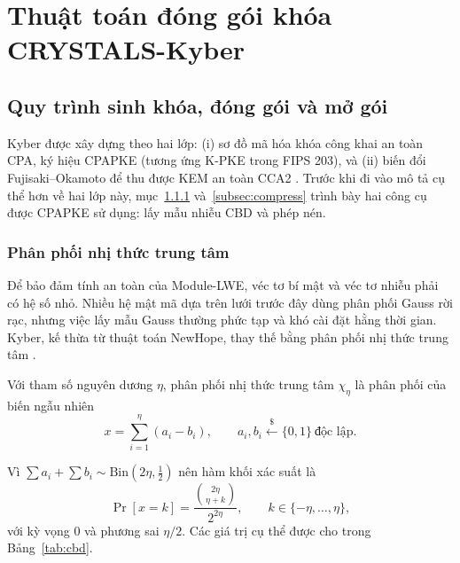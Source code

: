 \documentclass[../LuanVan.tex]{subfiles}
\begin{document}
\section{Thuật toán đóng gói khóa CRYSTALS-Kyber}\label{sec:kyber}
\subsection{Quy trình sinh khóa, đóng gói và mở gói}\label{subsec:quytrinh}

Kyber được xây dựng theo hai lớp: (i) sơ đồ mã hóa khóa công khai an toàn CPA, ký hiệu CPAPKE (tương ứng K-PKE trong FIPS 203), và (ii) biến đổi Fujisaki--Okamoto để thu được KEM an toàn CCA2 \cite{Bos18,Avanzi21}. Trước khi đi vào mô tả cụ thể hơn về hai lớp này, mục~\ref{subsec:cbd} và~\ref{subsec:compress} trình bày hai công cụ được CPAPKE sử dụng: lấy mẫu nhiễu CBD và phép nén.

\subsubsection{Phân phối nhị thức trung tâm}\label{subsec:cbd}

Để bảo đảm tính an toàn của Module-LWE, véc tơ bí mật và véc tơ nhiễu phải có hệ số nhỏ. Nhiều hệ mật mã dựa trên lưới trước đây dùng phân phối Gauss rời rạc, nhưng việc lấy mẫu Gauss thường phức tạp và khó cài đặt hằng thời gian. Kyber, kế thừa từ thuật toán NewHope, thay thế bằng phân phối nhị thức trung tâm \cite{Alkim16,Avanzi21}.

\begin{dn}
    Với tham số nguyên dương $\eta$, phân phối nhị thức trung tâm $\chi_\eta$ là phân phối của biến ngẫu nhiên
    \begin{equation}
        x = \sum_{i=1}^{\eta} (a_i - b_i), \qquad a_i, b_i \xleftarrow{\$} \{0,1\}\ \text{độc lập}.
    \end{equation}
\end{dn}

Vì $\sum a_i + \sum b_i \sim \mathrm{Bin}(2\eta,\tfrac12)$ nên hàm khối xác suất là
\begin{equation}
    \Pr[x=k] = \frac{\binom{2\eta}{\eta+k}}{2^{2\eta}}, \qquad k\in\{-\eta,\dots,\eta\},
\end{equation}
với kỳ vọng $0$ và phương sai $\eta/2$. Các giá trị cụ thể được cho trong Bảng~\ref{tab:cbd}.
\end{document}
